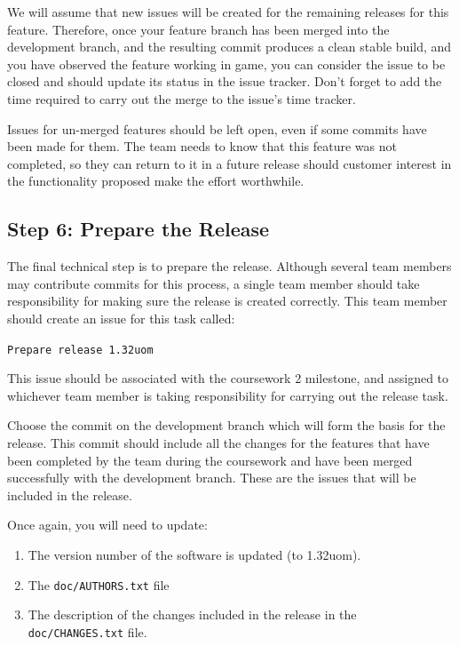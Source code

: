\documentclass[
]{book}
\providecommand{\tightlist}{%
  \setlength{\itemsep}{0pt}\setlength{\parskip}{0pt}}
\begin{document}
We will assume that new issues will be created for the remaining releases for this feature. Therefore, once your feature branch has been merged into the development branch, and the resulting commit produces a clean stable build, and you have observed the feature working in game, you can consider the issue to be closed and should update its status in the issue tracker. Don't forget to add the time required to carry out the merge to the issue's time tracker.

Issues for un-merged features should be left open, even if some commits have been made for them. The team needs to know that this feature was not completed, so they can return to it in a future release should customer interest in the functionality proposed make the effort worthwhile.

\hypertarget{reeleaseprep}{%
\subsection{Step 6: Prepare the Release}\label{reeleaseprep}}

The final technical step is to prepare the release. Although several team members may contribute commits for this process, a single team member should take responsibility for making sure the release is created correctly. This team member should create an issue for this task called:

\texttt{Prepare\ release\ 1.32uom}

This issue should be associated with the coursework 2 milestone, and assigned to whichever team member is taking responsibility for carrying out the release task.

Choose the commit on the development branch which will form the basis for the release. This commit should include all the changes for the features that have been completed by the team during the coursework and have been merged successfully with the development branch. These are the issues that will be included in the release.

Once again, you will need to update:

\begin{enumerate}
\def\labelenumi{\arabic{enumi}.}
\tightlist
\item
  The version number of the software is updated (to 1.32uom).
\item
  The \texttt{doc/AUTHORS.txt} file
\item
  The description of the changes included in the release in the \texttt{doc/CHANGES.txt} file.
\end{enumerate}
\end{document}
